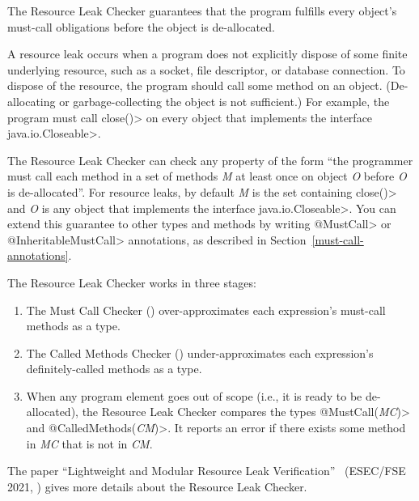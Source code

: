 \htmlhr
{}

The Resource Leak Checker guarantees that the program fulfills every
object's must-call obligations before the object is de-allocated.

A resource leak occurs when a program does not explicitly dispose of some finite
underlying resource, such as a socket, file descriptor, or database connection.  To dispose
of the resource, the program should call some method on an object.
(De-allocating or garbage-collecting the object is not sufficient.)  For
example, the program must call \<close()> on every object that implements the
interface \<java.io.Closeable>.

The Resource Leak Checker can check any property of the form ``the programmer
must call each method in a set of methods \emph{M} at least once
on object \emph{O} before \emph{O} is de-allocated''.  For resource leaks,
by default \emph{M} is the set containing
\<close()> and \emph{O} is any object that implements the interface
\<java.io.Closeable>.  You can extend this guarantee to other types and methods
by writing \<@MustCall> or \<@InheritableMustCall> annotations, as described in
Section~\ref{must-call-annotations}.

The Resource Leak Checker works in three stages:
\begin{enumerate}
\item The Must Call Checker ()
  over-approximates each expression's must-call methods as a
   type.
\item The Called Methods Checker ()
  under-approximates each expression's definitely-called methods as a
   type.
\item When any program element goes out of scope (i.e., it is ready to be
  de-allocated), the Resource Leak Checker compares the types
  \<@MustCall(\emph{MC})> and \<@CalledMethods(\emph{CM})>.  It reports an error
  if there exists some method in \emph{MC} that is not in \emph{CM}.
\end{enumerate}

The paper
``Lightweight and Modular Resource Leak Verification''~\cite{KelloggSSE2021} (ESEC/FSE 2021,
)
gives more details about the Resource Leak Checker.


